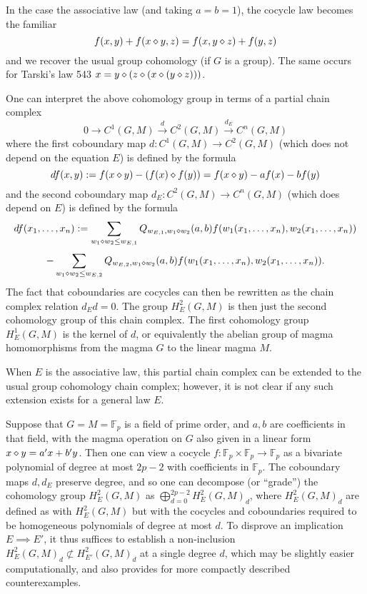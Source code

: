 \begin{remark} In the case the associative law (and taking $a=b=1$), the cocycle law becomes the familiar
  $$ f(x,y) + f(x \diamond y, z) = f(x, y \diamond z) + f(y,z)$$
and we recover the usual group cohomology (if $G$ is a group).  The same occurs for Tarski's law 543
$x = y \diamond (z \diamond (x \diamond (y \diamond z)))$.
\end{remark}

\begin{remark}  One can interpret the above cohomology group in terms of a partial chain complex
$$ 0 \to C^1(G,M) \stackrel{d}{\to} C^2(G,M) \stackrel{d_E}{\to} C^n(G,M)$$
where the first coboundary map $d: C^1(G,M) \to C^2(G,M)$ (which does not depend on the equation $E$) is defined by the formula
$$ df(x,y) := f(x \diamond y) - (f(x) \diamond f(y)) = f(x \diamond y) - af(x) - bf(y)$$
and the second coboundary map $d_E: C^2(G,M) \to C^n(G,M)$ (which does depend on $E$) is defined by the formula
$$ df(x_1,\dots,x_n) := \sum_{w_1 \diamond w_2 \leq w_{E,1}} Q_{w_{E,1},w_1 \diamond w_2}(a,b) f(w_1(x_1,\dots,x_n), w_2(x_1,\dots,x_n))$$
$$ - \sum_{w_1 \diamond w_2 \leq w_{E,2}} Q_{w_{E,2},w_1 \diamond w_2}(a,b) f(w_1(x_1,\dots,x_n), w_2(x_1,\dots,x_n)).$$
The fact that coboundaries are cocycles can then be rewritten as the chain complex relation $d_E d = 0$.  The group $H^2_E(G,M)$ is then just the second cohomology group of this chain complex.  The first cohomology group $H^1_E(G,M)$ is the kernel of $d$, or equivalently the abelian group of magma homomorphisms from the magma $G$ to the linear magma $M$.

When $E$ is the associative law, this partial chain complex can be extended to the usual group cohomology chain complex; however, it is not clear if any such extension exists for a general law $E$.
\end{remark}

\begin{remark}  Suppose that $G = M = \mathbb{F}_p$ is a field of prime order, and $a,b$ are coefficients in that field, with the magma operation on $G$ also given in a linear form $x \diamond y = a'x  + b' y$.  Then one can view a cocycle $f: \mathbb{F}_p \times \mathbb{F}_p \to \mathbb{F}_p$ as a bivariate polynomial of degree at most $2p-2$ with coefficients in $ \mathbb{F}_p$.  The coboundary maps $d, d_E$ preserve degree, and so one can decompose (or ``grade'') the cohomology group $H^2_E(G,M)$ as $\bigoplus_{d=0}^{2p-2} H^2_E(G,M)_d$, where $H^2_E(G,M)_d$ are defined as with $H^2_E(G,M)$ but with the cocycles and coboundaries required to be homogeneous polynomials of degree at most $d$.  To disprove an implication $E \implies E'$, it thus suffices to establish a non-inclusion $H^2_E(G,M)_d \not\subset H^2_{E'}(G,M)_d$ at a single degree $d$, which may be slightly easier computationally, and also provides for more compactly described counterexamples.
\end{remark}

